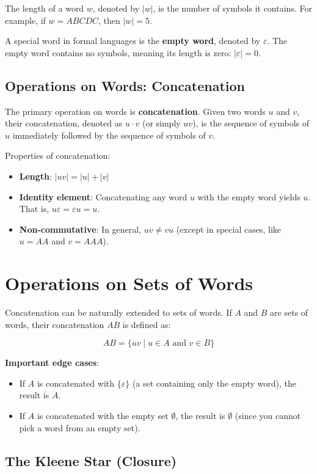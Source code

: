 The length of a word $w$, denoted by $|w|$, is the number of symbols it contains. For example, if $w = ABCDC$, then $|w| = 5$.

A special word in formal languages is the \textbf{empty word}, denoted by $\varepsilon$. The empty word contains no symbols, meaning its length is zero: $|\varepsilon| = 0$.

\subsection{Operations on Words: Concatenation}

The primary operation on words is \textbf{concatenation}. Given two words $u$ and $v$, their concatenation, denoted as $u \cdot v$ (or simply $uv$), is the sequence of symbols of $u$ immediately followed by the sequence of symbols of $v$. 

Properties of concatenation:
\begin{itemize}
\item \textbf{Length}: $|uv| = |u| + |v|$
\item \textbf{Identity element}: Concatenating any word $u$ with the empty word yields $u$. That is, $u\varepsilon = \varepsilon u = u$.
\item \textbf{Non-commutative}: In general, $uv \neq vu$ (except in special cases, like $u = AA$ and $v = AAA$).
\end{itemize}

\section{Operations on Sets of Words}

Concatenation can be naturally extended to sets of words. If $A$ and $B$ are sets of words, their concatenation $AB$ is defined as:

$$ AB = \{ uv \mid u \in A \text{ and } v \in B \} $$

\textbf{Important edge cases}:
\begin{itemize}
\item If $A$ is concatenated with $\{\varepsilon\}$ (a set containing only the empty word), the result is $A$.
\item If $A$ is concatenated with the empty set $\emptyset$, the result is $\emptyset$ (since you cannot pick a word from an empty set).
\end{itemize}

\subsection{The Kleene Star (Closure)}

